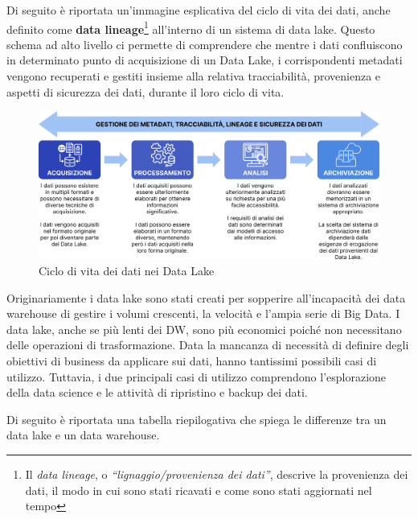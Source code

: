 Di seguito è riportata un'immagine esplicativa del ciclo di vita dei dati, anche definito come \textbf{data lineage}\footnote{Il \textit{data lineage}, o \textit{“lignaggio/provenienza dei dati”}, descrive la provenienza dei dati, il modo in cui sono stati ricavati e come sono stati aggiornati nel tempo} all'interno di un sistema di data lake. Questo schema ad alto livello ci permette di comprendere che mentre i dati confluiscono in determinato punto di acquisizione di un Data Lake, i corrispondenti metadati vengono recuperati e gestiti insieme alla relativa tracciabilità, provenienza e aspetti di sicurezza dei dati, durante il loro ciclo di vita.\cite{data_lake_for_enterprices}

\begin{figure}[H]
    \centering
    \includegraphics[width=1\linewidth]{figure/capitolo_2/Data Lake Life Cycle.pdf}
    \caption{Ciclo di vita dei dati nei Data Lake}
    \label{fig:Data Lake Life Cycle}
\end{figure}

Originariamente i data lake sono stati creati per sopperire all'incapacità dei data warehouse di gestire i volumi crescenti, la velocità e l'ampia serie di Big Data. I data lake, anche se più lenti dei DW, sono più economici poiché non necessitano delle operazioni di trasformazione. Data la mancanza di necessità di definire degli obiettivi di business da applicare sui dati, hanno tantissimi possibili casi di utilizzo. Tuttavia, i due principali casi di utilizzo comprendono l'esplorazione della data science e le attività di ripristino e backup dei dati.\cite{ibm_data_architecture}

Di seguito è riportata una tabella riepilogativa che spiega le differenze tra un data lake e un data warehouse.\cite{aws_data_lake_vs_data_warehouse}

